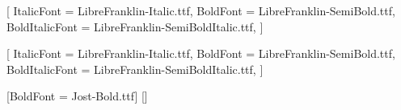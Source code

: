 \usepackage{fontspec}

\setmainfont{LibreFranklin-Regular.ttf}[
  ItalicFont     = LibreFranklin-Italic.ttf,
  BoldFont       = LibreFranklin-SemiBold.ttf,
  BoldItalicFont = LibreFranklin-SemiBoldItalic.ttf,
]

\setsansfont{LibreFranklin-Regular.ttf}[
  ItalicFont     = LibreFranklin-Italic.ttf,
  BoldFont       = LibreFranklin-SemiBold.ttf,
  BoldItalicFont = LibreFranklin-SemiBoldItalic.ttf,
]

\newfontfamily{}[BoldFont = Jost-Bold.ttf]
\newfontfamily{}[]
